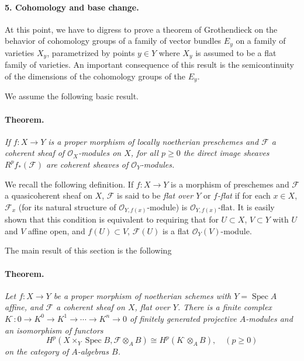 
\DeclareMathOperator{\Spec}{Spec}


\paragraph{5. Cohomology and base change.}
At this point, we have to digress to prove a theorem of Grothendieck on the
behavior of cohomology groups of a family of vector bundles $E_y$ on a family
of varieties $X_y$, parametrized by points $y \in Y$ where $X_y$ is assumed
to be a flat family of varieties. An important consequence of this result is
the semicontinuity of the dimensions of the cohomology groups of the $E_y$.

We assume the following basic result.

\paragraph{Theorem.}
\textit{If $f : X \to Y$ is a proper morphism of locally noetherian
preschemes and $\mathcal{F}$ a coherent sheaf of $\mathcal{O}_X$-modules on
$X$, for all $p \geq 0$ the direct image sheaves $R^p f_*(\mathcal{F})$ are
coherent sheaves of $\mathcal{O}_Y$-modules.}

We recall the following definition. If $f : X \to Y$ is a morphism of
preschemes and $\mathcal{F}$ a quasicoherent sheaf on $X$, $\mathcal{F}$ is
said to be \textit{flat over $Y$} or \textit{$f$-flat} if for each
$x \in X$, $\mathcal{F}_x$ (for its natural structure of
$\mathcal{O}_{Y, f(x)}$-module) is $\mathcal{O}_{Y, f(x)}$-flat. It is easily
shown that this condition is equivalent to requiring that for $U \subset X$,
$V \subset Y$ with $U$ and $V$ affine open, and $f(U) \subset V$,
$\mathcal{F}(U)$ is a flat $\mathcal{O}_Y(V)$-module.

The main result of this section is the following

\paragraph{Theorem.}
\textit{Let $f : X \to Y$ be a proper morphism of noetherian schemes with
$Y = \Spec A$ affine, and $\mathcal{F}$ a coherent sheaf on $X$, flat over
$Y$. There is a finite complex
$K^{\cdot} : 0 \to K^0 \to K^1 \to \cdots \to K^n \to 0$
of finitely generated projective $A$-modules and an isomorphism of functors}
\[
  H^p(X \times_Y \Spec B, \mathcal{F} \otimes_A B)
    \cong H^p(K^{\cdot} \otimes_A B), \quad (p \geq 0)
\]
\textit{on the category of $A$-algebras $B$.}


